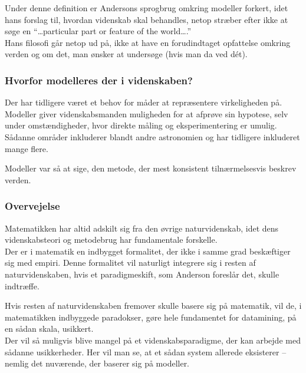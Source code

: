 Under denne definition er Andersons sprogbrug omkring modeller forkert, idet
hans forslag til, hvordan videnskab skal behandles, netop stræber efter ikke at
søge en ``\ldots particular part or feature of the world\ldots.''\\
Hans filosofi går netop ud på, ikke at have en forudindtaget opfattelse omkring
verden og om det, man ønsker at undersøge (hvis man da ved dét).

\subsubsection{Hvorfor modelleres der i videnskaben?}
Der har tidligere været et behov for måder at repræsentere virkeligheden på.
Modeller giver videnskabsmanden muligheden for at afprøve sin hypotese, selv
under omstændigheder, hvor direkte måling og eksperimentering er umulig.\\
Sådanne områder inkluderer blandt andre astronomien og har tidligere inkluderet
mange flere.

Modeller var så at sige, den metode, der mest konsistent tilnærmelsesvis beskrev
verden.

\subsubsection{Overvejelse}
Matematikken har altid adskilt sig fra den øvrige naturvidenskab, idet dens
videnskabsteori og metodebrug har fundamentale forskelle.\\
Der er i matematik en indbygget formalitet, der ikke i samme grad beskæftiger
sig med empiri. Denne formalitet vil naturligt integrere sig i resten af
naturvidenskaben, hvis et paradigmeskift, som Anderson foreslår det, skulle
indtræffe.

Hvis resten af naturvidenskaben fremover skulle basere sig på matematik, vil
de, i matematikken indbyggede paradokser, gøre hele fundamentet for
datamining, på en sådan skala, usikkert.\\
Der vil så muligvis blive mangel på et videnskabsparadigme, der kan arbejde
med sådanne usikkerheder. Her vil man se, at et sådan system allerede
eksisterer -- nemlig det nuværende, der baserer sig på modeller.

